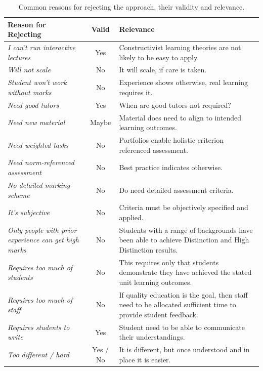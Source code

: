 \begin{table}[p]
	\centering	
	\caption{Common reasons for rejecting the approach, their validity and relevance. }
	\label{tbl:common_reasons}
	\begin{tabular}{p{5.5cm}|c|p{6cm}}
		\textbf{Reason for Rejecting} & \textbf{Valid} & \textbf{Relevance} \\
		\hline
		\emph{I can't run interactive lectures} 	& Yes   & Constructivist learning theories are not likely to be easy to apply. \\
		\emph{Will not scale} 						& No    & It will scale, if care is taken. \\
		\emph{Student won't work without marks} 	& No    & Experience shows otherwise, real learning requires it. \\
		\emph{Need good tutors} 					& Yes   & When are good tutors not required? \\
		\emph{Need new material} 					& Maybe & Material does need to align to intended learning outcomes. \\
		\emph{Need weighted tasks} 					& No    & Portfolios enable holistic criterion referenced assessment. \\
		\emph{Need norm-referenced assessment} 		& No    & Best practice indicates otherwise. \\
		\emph{No detailed marking scheme} 			& No    & Do need detailed assessment criteria. \\
		\emph{It's subjective} 						& No    & Criteria must be objectively specified and applied. \\
		\emph{Only people with prior experience can get high marks} & No & Students with a range of backgrounds have been able to achieve Distinction and High Distinction results. \\
		\emph{Requires too much of students} 		& No    & This requires only that students demonstrate they have achieved the stated unit learning outcomes. \\
		\emph{Requires too much of staff}			& No 	& If quality education is the goal, then staff need to be allocated sufficient time to provide student feedback. \\
		\emph{Requires students to write}  			& Yes   & Student need to be able to communicate their understandings. \\
		\emph{Too different / hard} 				& Yes / No & It is different, but once understood and in place it is easier.\\
	\end{tabular}
\end{table}

